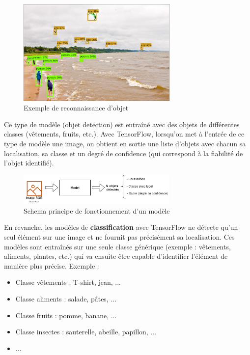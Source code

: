 \documentclass[UTF8]{EPURapport}
\begin{document}
\begin{figure}[h!]
\centering
  \includegraphics[width=0.7\textwidth]{images/object_detection.jpg}
  \caption{Exemple de reconnaissance d'objet}
  \label{fig:objectdetection}
\end{figure}

 Ce type de modèle (objet detection) est entraîné avec des objets de différentes classes (vêtements, fruits, etc.). Avec TensorFlow, lorsqu'on met à l'entrée de ce type de modèle une image, on obtient en sortie une liste d'objets avec chacun sa localisation, sa classe et un degré de confidence (qui correspond à la fiabilité de l'objet identifié).

\begin{figure}[h!]
\centering
  \includegraphics[width=0.7\textwidth]{images/schema_objectDetection.png}
  \caption{Schema principe de fonctionnement d'un modèle}
  \label{fig:schema_objectdetection}
\end{figure}

En revanche, les modèles de \textbf{classification} avec TensorFlow ne détecte qu'un seul élément sur une image et ne fournit pas précisément sa localisation. Ces modèles sont entraînés sur une seule classe générique (exemple : vêtements, aliments, plantes, etc.) qui va ensuite être capable d'identifier l'élément de manière plus précise. Exemple : \\

\begin{itemize}
  \item Classe vêtements : T-shirt, jean, ...
  \item Classe aliments : salade, pâtes, ...
  \item Classe fruits : pomme, banane, ...  
  \item Classe insectes : sauterelle, abeille, papillon, ...
  \item  ...
\end{itemize}
\end{document}

